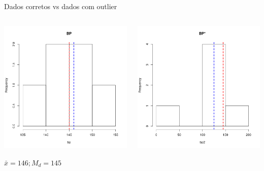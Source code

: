\documentclass{beamer}
\begin{document}
\begin{frame}{\scriptsize Dados corretos vs dados com outlier}
  \begin{columns}
    \begin{column}{5cm}
      \begin{center}
        \includegraphics[width=\textwidth]{Cap3/histograma-bp}

        \scriptsize
        \bigskip
        $\bar{x} = 146 ; M_d= 145$
      \end{center}

    \end{column}
    \begin{column}{5cm}
      \begin{center}
        \includegraphics[width=\textwidth]{Cap3/histograma-bp2}


\end{center}
\end{column}
\end{columns}
\end{frame}
\end{document}
